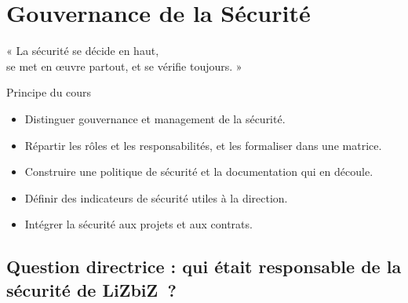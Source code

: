 
\chapter{Gouvernance de la Sécurité}
\label{chap:gouvernance}

\epigraph{%
    « La sécurité se décide en haut,\\
    se met en œuvre partout, et se vérifie toujours. »%
}{Principe du cours}


\begin{boxobjectifs}
\begin{itemize}
    \item Distinguer gouvernance et management de la sécurité.
    \item Répartir les rôles et les responsabilités, et les formaliser dans
          une matrice.
    \item Construire une politique de sécurité et la documentation qui
          en découle.
    \item Définir des indicateurs de sécurité utiles à la direction.
    \item Intégrer la sécurité aux projets et aux contrats.
\end{itemize}
\end{boxobjectifs}

\bigskip

\section*{Question directrice : qui était responsable de la sécurité de LiZbiZ~?}

